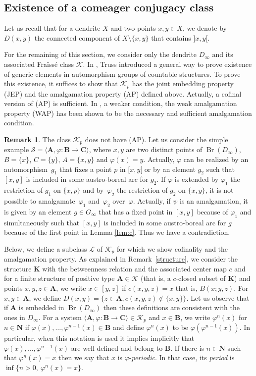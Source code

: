 \documentclass[JEP,XML,SOM,Unicode,NoFloatCountersInSection]{cedram}
\let\mathcal\mathscr
\theoremstyle{plain}
\theoremstyle{definition}
\newtheorem{rem}[thm]{Remark}
\newcommand{\bA}{{\boldsymbol{A}}}
\newcommand{\bB}{{\boldsymbol{B}}}
\newcommand{\bC}{{\boldsymbol{C}}}
\newcommand{\bK}{{\boldsymbol{K}}}
\newcommand{\NN}{\mathbf{N}}
\newcommand{\cK}{\mathcal{K}}
\newcommand{\cL}{\mathcal{L}}
\newcommand{\cS}{\mathcal{S}}
\DeclareMathOperator{\Br}{Br}
\begin{document}
\subsection{Existence of a comeager conjugacy class} Let us recall that for a dendrite $X$ and two points $x,y\in X$, we denote by $D(x,y)$ the connected component of $X\setminus\{x,y\}$ that contains $]x,y[$.

For the remaining of this section, we consider only the dendrite $D_\infty$ and its associated Fraïssé class $\cK$. In \cite{MR1162490}, Truss introduced a general way to prove existence of generic elements in automorphism groups of countable structures. To prove this existence, it suffices to show that $\cK_p$ has the joint embedding property (JEP) and the amalgamation property (AP) defined above. Actually, a cofinal version of (AP) is sufficient. In \cite{Kechris-Rosendal}, a weaker condition, the weak amalgamation property (WAP) has been shown to be the necessary and sufficient amalgamation condition.

\begin{rem}\label{notAP} The class $\cK_p$ does not have (AP). Let us consider the simple example $\cS=\langle \bA,\varphi\colon\bB\to\bC\rangle$, where $x,y$ are two distinct points of $\Br(D_\infty)$, $B=\{x\}$, $C=\{y\}$, $A=\{x,y\}$ and $\varphi(x)=y$. Actually, $\varphi$ can be realized by an automorphism~$g_1$ that fixes a point $p$ in $[x,y[$ or by an element $g_2$ such that $[x,y]$ is included in some austro-boreal arc for $g_2$. If $\varphi$ is extended by $\varphi_1$ the restriction of $
g_1$ on $\{x,p\}$ and by~$\varphi_2$ the restriction of $g_2$ on $\{x,y\}$, it is not possible to amalgamate~$\varphi_1$ and~$\varphi_2$ over~$\varphi$. Actually, if $\psi$ is an amalgamation, it is given by an element $g\in G_\infty$ that has a fixed point in $[x,y]$ because of $\varphi_1$ and simultaneously such that $[x,y]$ is included in some austro-boreal arc for $g$ because of the first point in Lemma \ref{lem:c}. Thus we have a contradiction.
\end{rem}

Below, we define a subclass $\cL$ of $\cK_p$ for which we show cofinality and the amalgamation property. As explained in Remark~\ref{structure}, we consider the structure $\bK$ with the betweenness relation and the associated center map $c$ and for a finite structure of positive type $\bA\in\cK$ (that is, a $c$-closed subset of $\bK$) and points $x,y,z\in\bA$, we write $x\in[y,z]$ if $c(x,y,z)=x$ that is, $B(x;y,z)$. For $x,y\in\bA$, we define $D(x,y)=\{z\in \bA, c(x,y,z)\notin\{x,y\}\}$. Let us observe that if $\bA$ is embedded in $\Br(D_\infty)$ then these definitions are consistent with the ones in $D_\infty$. For a system $\langle \bA,\varphi\colon\bB\to\bC\rangle\in\cK_p$ and $x\in \bB$, we write $\varphi^n(x)$ for $n\in\NN$ if $\varphi(x),\dots,\varphi^{n-1}(x)\in\bB$ and define $\varphi^n(x)$ to be $\varphi(\varphi^{n-1}(x))$. In particular, when this notation is used it implies implicitly that $\varphi(x),\dots,\varphi^{n-1}(x)$ are well-defined and belong to $\bB$. If there is $n\in \NN$ such that $\varphi^n(x)=x$ then we say that $x$ is $\varphi$-\emph{periodic}. In that case, its \emph{period} is $\inf\{n>0,\ \varphi^n(x)=x\}$.
\end{document}
